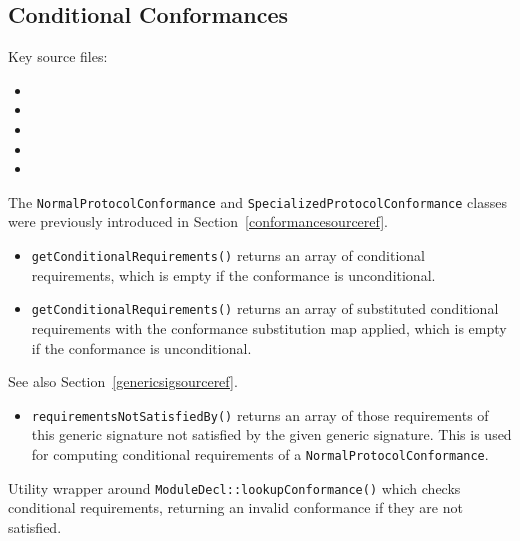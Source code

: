 \documentclass[../generics]{subfiles}
\begin{document}
\subsection*{Conditional Conformances}


Key source files:
\begin{itemize}
\item {}
\item {}
\item {}
\item {}
\item {}
\end{itemize}
The \verb|NormalProtocolConformance| and \verb|SpecializedProtocolConformance| classes were previously introduced in Section~\ref{conformancesourceref}.
\begin{itemize}
\item \texttt{getConditionalRequirements()} returns an array of conditional requirements, which is empty if the conformance is unconditional.
\end{itemize}
\begin{itemize}
\item \texttt{getConditionalRequirements()} returns an array of substituted conditional requirements with the conformance substitution map applied, which is empty if the conformance is unconditional.
\end{itemize}
See also Section~\ref{genericsigsourceref}.
\begin{itemize}
\item \texttt{requirementsNotSatisfiedBy()} returns an array of those requirements of this generic signature not satisfied by the given generic signature. This is used for computing conditional requirements of a \texttt{NormalProtocolConformance}.
\end{itemize}

Utility wrapper around \texttt{ModuleDecl::lookupConformance()} which checks conditional requirements, returning an invalid conformance if they are not satisfied.
\end{document}
